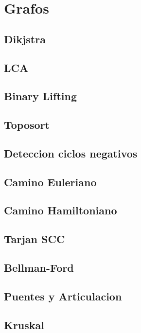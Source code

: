 \documentclass[a4paper,11pt,landscape,twocolumn]{article}
\begin{document}
\section{Grafos} %
\subsection{Dikjstra}

\subsection{LCA}

\subsection{Binary Lifting}

\subsection{Toposort}

\subsection{Deteccion ciclos negativos}

\subsection{Camino Euleriano}

\subsection{Camino Hamiltoniano}

\subsection{Tarjan SCC}

\subsection{Bellman-Ford}

\subsection{Puentes y Articulacion}

\subsection{Kruskal}

\end{document}
